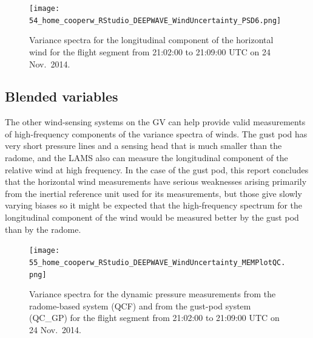 \documentclass[12pt,twoside,english]{article}\usepackage[]{graphicx}\usepackage[]{color}
\let\OrgIndex\index
\renewcommand*{\index}[1]{\OrgIndex{#1}}
\begin{document}
\begin{figure}
\noindent \begin{centering}
\texttt{[image: 54\_home\_cooperw\_RStudio\_DEEPWAVE\_WindUncertainty\_PSD6.png]}  
\par\end{centering}

\protect\protect\protect\caption{\label{fig:AppxB-PSD6}Variance spectra for the longitudinal component of the horizontal wind for the flight segment from 21:02:00 to 21:09:00 UTC on 24 Nov.\ 2014.} 
\end{figure}

\subsection{\textquotedbl{}Blended\textquotedbl{} variables}

The other wind-sensing systems on the GV can help provide valid measurements of high-frequency components of the variance spectra of winds. The gust pod has very short pressure lines and a sensing head that is much smaller than the radome, and the LAMS also can measure the longitudinal component of the relative wind at high frequency. In the case of the gust pod, this report concludes that the horizontal wind measurements have serious weaknesses arising primarily from the inertial reference unit used for its measurements, but those give slowly varying biases so it might be expected that the high-frequency spectrum for the longitudinal component of the wind would be measured better by the gust pod than by the radome. 


\begin{figure}
\noindent \begin{centering}
\texttt{[image: 55\_home\_cooperw\_RStudio\_DEEPWAVE\_WindUncertainty\_MEMPlotQC.png]}  
\par\end{centering}

\protect\protect\protect\caption{\label{fig:AppxB-PSD1314}Variance spectra for the dynamic pressure measurements from the radome-based system (QCF) and from the gust-pod system (QC\_GP) for the flight segment from 21:02:00 to 21:09:00 UTC on 24 Nov.\ 2014.} 
\end{figure}
\end{document}
